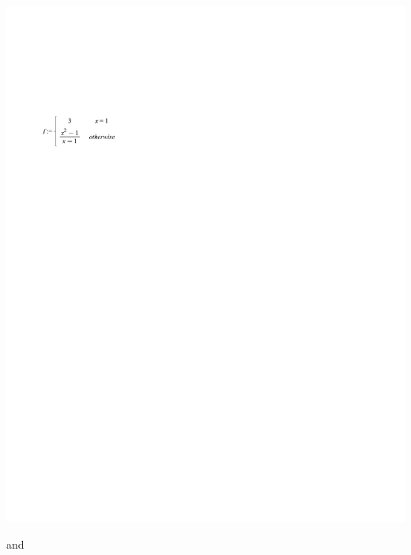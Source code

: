 \documentclass[handout,nooutcomes]{ximera}
\begin{document}
\begin{problem}
\begin{enumerate}
\begin{freeResponse}
			 	\begin{image}
			 	\includegraphics[trim= 70 575 300 165]{Figure7.pdf}
			 	\end{image}
			 	
			and
			

\end{freeResponse}
\end{enumerate}
\end{problem}
\end{document}

